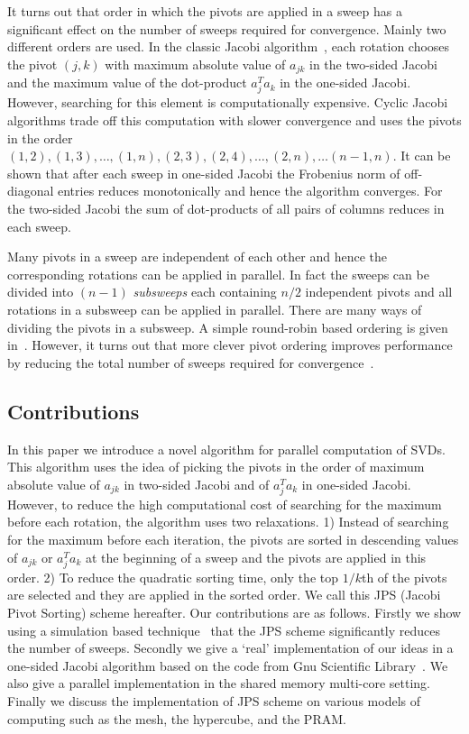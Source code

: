 \documentclass[10pt, conference, compsocconf]{IEEEtran}
\begin{document}
It turns out that order in which the pivots are applied in a sweep has a significant effect on the number of sweeps required for convergence. Mainly two different orders are used. In the classic Jacobi algorithm~\cite{golub2012matrix}, each rotation chooses the pivot $(j,k)$ with maximum absolute value of $a_{jk}$ in the two-sided Jacobi and the maximum value of the dot-product $a_j^{T}a_k$ in the one-sided Jacobi. However, searching for this element is computationally expensive. Cyclic Jacobi algorithms trade off this computation with slower convergence and uses the pivots in the order $(1,2), (1,3), \ldots, (1,n), (2,3), (2,4), \ldots, (2,n), \ldots (n-1,n)$.  It can be shown that after each sweep in one-sided Jacobi the Frobenius norm of off-diagonal entries reduces monotonically and hence the algorithm converges. For the two-sided Jacobi the sum of dot-products of all pairs of columns reduces in each sweep.

Many pivots in a sweep are independent of each other and hence the corresponding rotations can be applied in parallel. In fact the sweeps can be divided into $(n-1)$ \emph{subsweeps} each containing $n/2$ independent pivots and all rotations in a subsweep can be applied in parallel. There are many ways of dividing the pivots in a subsweep. A simple round-robin based ordering is given in~\cite{golub2012matrix}. However, it turns out that more clever pivot ordering improves performance by reducing the total number of sweeps required for convergence~\cite{becka2002dynamic}.

\subsection{Contributions}

In this paper we introduce a novel algorithm for parallel computation of SVDs. This algorithm uses the idea of picking the pivots in the order of maximum absolute value of $a_{jk}$ in two-sided Jacobi and of $a_j^T a_k$ in one-sided Jacobi. However, to reduce the high computational cost of searching for the maximum before each rotation, the algorithm uses two relaxations. 1) Instead of searching for the maximum before each iteration, the pivots are sorted in descending values of $a_{jk}$ or $a_j^T a_k$ at the beginning of a sweep and the pivots are applied in this order. 2) To reduce the quadratic sorting time, only the top $1/k$th of the pivots are selected and they are applied in the sorted order. We call this JPS (Jacobi Pivot Sorting) scheme hereafter. Our contributions are as follows. Firstly we show using a simulation based technique~\cite{rajasekaran2008relaxation} that the JPS scheme significantly reduces the number of sweeps. Secondly we give a `real' implementation of our ideas in a one-sided Jacobi algorithm based on the code from Gnu Scientific Library~\cite{galassi1996gnu}. We also give a parallel implementation in the shared memory multi-core setting. Finally we discuss the implementation of JPS scheme on various models of computing such as the mesh, the hypercube, and the PRAM.
 
\end{document}
